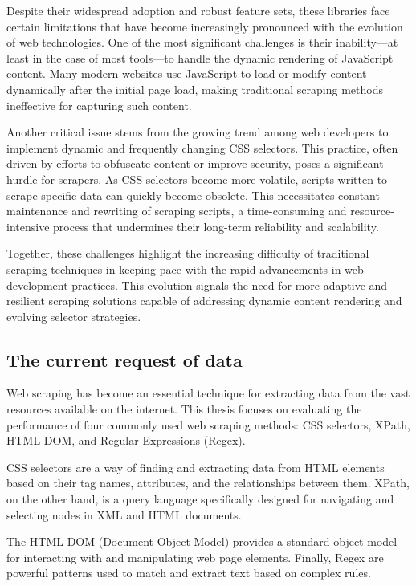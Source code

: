 Despite their widespread adoption and robust feature sets, these libraries face certain limitations that have become increasingly pronounced with the evolution of web technologies. One of the most significant challenges is their inability—at least in the case of most tools—to handle the dynamic rendering of JavaScript content. Many modern websites use JavaScript to load or modify content dynamically after the initial page load, making traditional scraping methods ineffective for capturing such content.

Another critical issue stems from the growing trend among web developers to implement dynamic and frequently changing CSS selectors. This practice, often driven by efforts to obfuscate content or improve security, poses a significant hurdle for scrapers. As CSS selectors become more volatile, scripts written to scrape specific data can quickly become obsolete. This necessitates constant maintenance and rewriting of scraping scripts, a time-consuming and resource-intensive process that undermines their long-term reliability and scalability.

Together, these challenges highlight the increasing difficulty of traditional scraping techniques in keeping pace with the rapid advancements in web development practices. This evolution signals the need for more adaptive and resilient scraping solutions capable of addressing dynamic content rendering and evolving selector strategies.

\subsection{The current request of data}
Web scraping has become an essential technique for extracting data from the vast resources available on the internet. This thesis focuses on evaluating the performance of four commonly used web scraping methods: CSS selectors, XPath, HTML DOM, and Regular Expressions (Regex).

CSS selectors are a way of finding and extracting data from HTML elements based on their tag names, attributes, and the relationships between them. XPath, on the other hand, is a query language specifically designed for navigating and selecting nodes in XML and HTML documents. 

The HTML DOM (Document Object Model) provides a standard object model for interacting with and manipulating web page elements. Finally, Regex are powerful patterns used to match and extract text based on complex rules.

